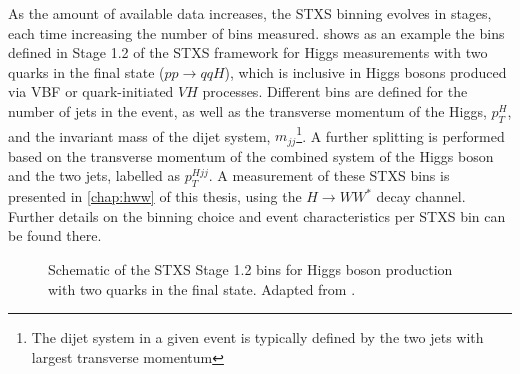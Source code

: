 As the amount of available data increases, the STXS binning evolves in stages, each time increasing the number of bins measured. 
 shows as an example the bins defined in Stage 1.2 of the STXS framework for Higgs measurements with two quarks in the final state ($pp \to qqH$), which is inclusive in Higgs bosons produced via VBF or quark-initiated $VH$ processes. 
Different bins are defined for the number of jets in the event, as well as the transverse momentum of the Higgs, $p_T^{H}$, and the invariant mass of the dijet system, $m_{jj}$\footnote{The dijet system in a given event is typically defined by the two jets with largest transverse momentum}. A further splitting is performed based on the transverse momentum of the combined system of the Higgs boson and the two jets, labelled as $p_T^{Hjj}$. 
A measurement of these STXS bins is presented in \cref{chap:hww} of this thesis, using the $H \to WW^*$ decay channel. Further details on the binning choice and event characteristics per STXS bin can be found there.

\begin{figure}
  \caption{Schematic of the STXS Stage 1.2 bins for Higgs boson production with two quarks in the final state. Adapted from .}
  \label{fig:stxs-stage12}
\end{figure}




